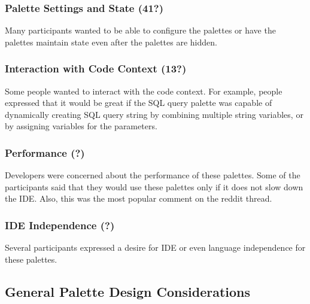 \documentclass[conference]{IEEEtran}
\begin{document}
\subsubsection{Palette Settings and State (41?)}

Many participants wanted to be able to configure the palettes or have the palettes maintain state even after the palettes are hidden. %


\subsubsection{Interaction with Code Context (13?)}

Some people wanted to interact with the code context. For example, people expressed that it would be great if the SQL query palette was capable of dynamically creating SQL query string by combining multiple string variables, or by assigning variables for the parameters.

\subsubsection{Performance (?)}

Developers were concerned about the performance of these palettes. Some of the participants said that they would use these palettes only if it does not slow down the IDE. Also, this was the most popular comment on the reddit thread.

\subsubsection{IDE Independence (?)}

Several participants expressed a desire for IDE or even language independence for these palettes.

\subsection{General Palette Design Considerations}
\end{document}
